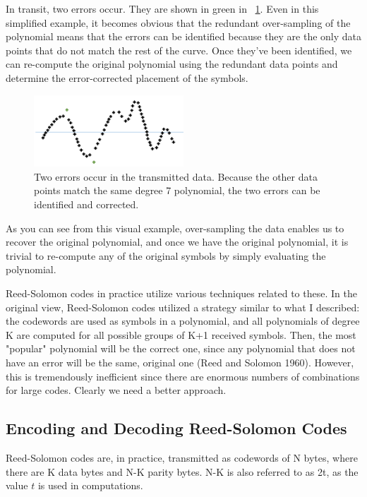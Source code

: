 \documentclass[12pt]{article}
\begin{document}
In transit, two errors occur. They are shown in green in ~\ref{fig:poly3}. Even in this simplified example, it becomes obvious that the redundant over-sampling of the polynomial means that the errors can be identified because they are the only data points that do not match the rest of the curve. Once they've been identified, we can re-compute the original polynomial using the redundant data points and determine the error-corrected placement of the symbols. 

\begin{figure}[h!]
 \centering
 \includegraphics[width=0.5\textwidth]{img/poly3.png}
 \caption{Two errors occur in the transmitted data. Because the other data points match the same degree 7 polynomial, the two errors can be identified and corrected.}
 \label{fig:poly3}
 \end{figure}

 As you can see from this visual example, over-sampling the data enables us to recover the original polynomial, and once we have the original polynomial, it is trivial to re-compute any of the original symbols by simply evaluating the polynomial.

Reed-Solomon codes in practice utilize various techniques related to these. In the original view, Reed-Solomon codes utilized a strategy similar to what I described: the codewords are used as symbols in a polynomial, and all polynomials of degree K are computed for all possible groups of K+1 received symbols. Then, the most "popular" polynomial will be the correct one, since any polynomial that does not have an error will be the same, original one (Reed and Solomon 1960). However, this is tremendously inefficient since there are enormous numbers of combinations for large codes. Clearly we need a better approach.  \cite{rs}

\subsection{Encoding and Decoding Reed-Solomon Codes}

Reed-Solomon codes are, in practice, transmitted as codewords of N bytes, where there are K data bytes and N-K parity bytes. N-K is also referred to as 2t, as the value $t$ is used in computations. 
\end{document}
